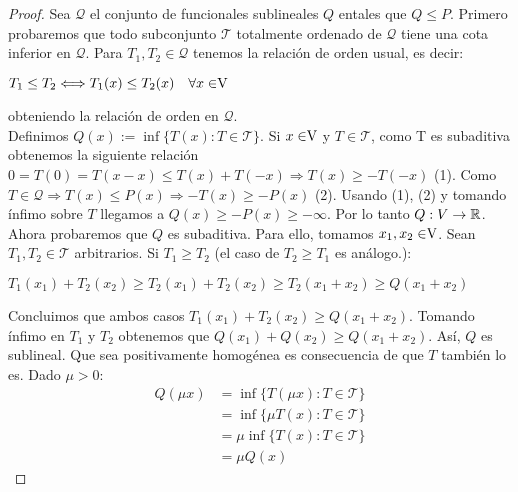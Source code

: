 	\begin{proof}
		Sea $ \mathcal{Q} $ el conjunto de funcionales sublineales $ Q $ en\vecSpace tales que $ Q \leq P $. Primero probaremos que todo subconjunto $ \mathcal{T} $ totalmente ordenado de $ \mathcal{Q} $ tiene una cota inferior en $ \mathcal{Q} $. Para $ T_1 ,T_2 \in \mathcal{Q} $ tenemos la relación de orden usual, es decir:
		\begin{center}
			$ T_1 \leq T_2 \Longleftrightarrow T_1 (x) \leq T_2 (x) \quad \forall x \in \vecSpace $
		\end{center}
		
		obteniendo la relación de orden en  $ \mathcal{Q} $. \\ 
		
		Definimos $ Q(x):=\inf \{ T(x): T \in \mathcal{T} \} $. Si $ x \in \vecSpace $ y $ T \in \mathcal{T} $, como T es subaditiva obtenemos la siguiente relación $ 0 = T(0) = T(x-x) \leq T(x) + T(-x) \Longrightarrow T(x) \geq -T(-x) $ (1). Como $ T \in \mathcal{Q} \Longrightarrow T(x) \leq P(x) \Longrightarrow -T(x) \geq -P(x)$ (2). Usando (1), (2) y tomando ínfimo sobre $  T $  llegamos a $ Q(x) \geq -P(x) \geq - \infty $. Por lo tanto $ Q:V \rightarrow \mathbb{R}$. \\
		
		Ahora probaremos que $ Q $ es subaditiva. Para ello, tomamos $ x_1, x_2\in \vecSpace $. Sean $ T_1 , T_2 \in \mathcal{T} $ arbitrarios. Si $ T_1 \geq T_2 $ (el caso de $ T_2 \geq T_1 $ es análogo.):
		
		\begin{center}
			$ T_1 (x_1)+  T_2 (x_2) \geq T_2(x_1)+  T_2 (x_2) \geq T_2(x_1 +x_2) \geq Q(x_1 + x_2)$
		\end{center}
		
		Concluimos que ambos casos $ T_1 (x_1)+  T_2 (x_2) \geq Q(x_1 + x_2)$. Tomando ínfimo en $ T_1 $ y $ T_2 $ obtenemos que $ Q (x_1)+  Q(x_2) \geq Q(x_1 + x_2)$. Así, $ Q $ es sublineal. Que sea positivamente homogénea es consecuencia de que $ T $ también lo es. Dado $ \mu > 0 $:
		\begin{equation*}
		\begin{split}
		Q(\mu x) &=\inf \{ T(\mu x): T \in \mathcal{T} \} \\ 
		& = \inf \{ \mu T( x): T \in \mathcal{T} \} \\ 
		&= \mu\inf \{ T( x): T \in \mathcal{T} \} \\ 
		&= \mu Q(x) 
		\end{split}
		\end{equation*}
		

\end{proof}
